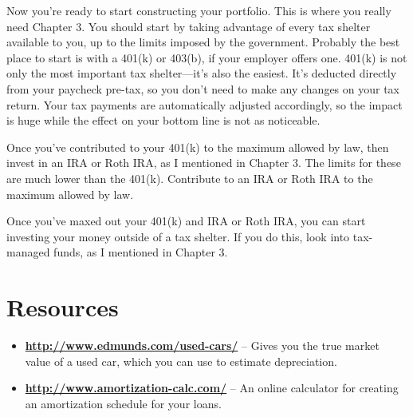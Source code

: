 Now you're ready to start constructing your portfolio. This is where you really need Chapter 3. You should start by taking advantage of every tax shelter available to you, up to the limits imposed by the government. Probably the best place to start is with a 401(k) or 403(b), if your employer offers one. 401(k) is not only the most important tax shelter---it's also the easiest. It's deducted directly from your paycheck pre-tax, so you don't need to make any changes on your tax return. Your tax payments are automatically adjusted accordingly, so the impact is huge while the effect on your bottom line is not as noticeable.

Once you've contributed to your 401(k) to the maximum allowed by law, then invest in an IRA or Roth IRA, as I mentioned in Chapter 3. The limits for these are much lower than the 401(k). Contribute to an IRA or Roth IRA to the maximum allowed by law.

Once you've maxed out your 401(k) and IRA or Roth IRA, you can start investing your money outside of a tax shelter. If you do this, look into tax-managed funds, as I mentioned in Chapter 3.

\newpage
\section{Resources}
\begin{itemize}
\item \textbf{\url{http://www.edmunds.com/used-cars/}} -- Gives you the true market value of a used car, which you can use to estimate depreciation.
\item \textbf{\url{http://www.amortization-calc.com/}} -- An online calculator for creating an amortization schedule for your loans.
\end{itemize}
